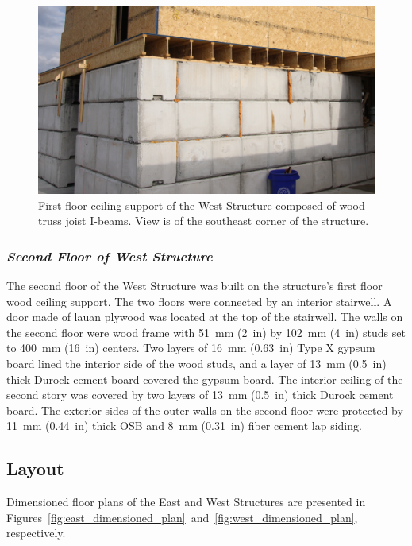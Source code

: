 \begin{figure}[!h]
	\centering
	\includegraphics[width=0.9\columnwidth]{Figures/Pictures/TJI_support}
	\caption[Ceiling support of the West Structure]{First floor ceiling support of the West Structure composed of wood truss joist I-beams. View is of the southeast corner of the structure.}
	\label{fig:TJI}
\end{figure}
\FloatBarrier

\subsubsection*{\textit{Second Floor of West Structure}}
The second floor of the West Structure was built on the structure's first floor wood ceiling support. The two floors were connected by an interior stairwell. A door made of lauan plywood was located at the top of the stairwell. The walls on the second floor were wood frame with 51~mm (2~in) by 102~mm (4~in) studs set to 400~mm (16~in) centers. Two layers of 16~mm (0.63~in) Type X gypsum board lined the interior side of the wood studs, and a layer of 13~mm (0.5~in) thick Durock cement board covered the gypsum board. The interior ceiling of the second story was covered by two layers of 13~mm (0.5~in) thick Durock cement board. The exterior sides of the outer walls on the second floor were protected by 11~mm (0.44~in) thick OSB and 8~mm (0.31~in) fiber cement lap siding.

\subsection{Layout}
Dimensioned floor plans of the East and West Structures are presented in Figures~\ref{fig:east_dimensioned_plan}~and~\ref{fig:west_dimensioned_plan}, respectively.

